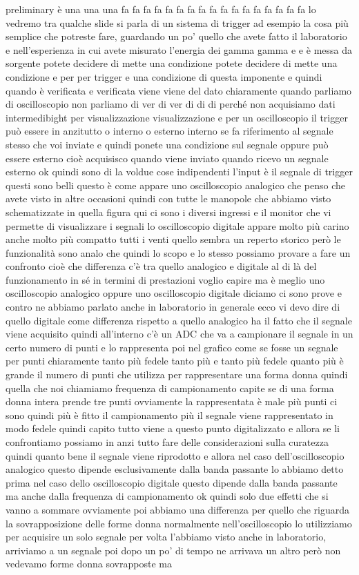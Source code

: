 preliminary è una una una fa fa fa fa fa fa fa fa fa fa fa fa fa fa fa fa fa lo vedremo tra qualche slide si parla di un sistema di trigger ad esempio la cosa più semplice che potreste fare, guardando un po' quello che avete fatto il laboratorio e nell'esperienza in cui avete misurato l'energia dei gamma gamma e e è messa da sorgente potete decidere di mette una condizione potete decidere di mette una condizione e per per trigger e una condizione di questa imponente e quindi quando è verificata e verificata viene viene del dato chiaramente quando parliamo di oscilloscopio non parliamo di ver di ver di di di perché non acquisiamo dati intermedibight per visualizzazione visualizzazione e per un oscilloscopio il trigger può essere in anzitutto o interno o esterno interno se fa riferimento al segnale stesso che voi inviate e quindi ponete una condizione sul segnale oppure può essere esterno cioè acquisisco quando viene inviato quando ricevo un segnale esterno ok quindi sono di la voldue cose indipendenti l'input è il segnale di trigger questi sono belli questo è come appare uno oscilloscopio analogico che penso che avete visto in altre occasioni quindi con tutte le manopole che abbiamo visto schematizzate in quella figura qui ci sono i diversi ingressi e il monitor che vi permette di visualizzare i segnali lo oscilloscopio digitale appare molto più carino anche molto più compatto tutti i venti quello sembra un reperto storico però le funzionalità sono analo che quindi lo scopo e lo stesso possiamo provare a fare un confronto cioè che differenza c'è tra quello analogico e digitale al di là del funzionamento in sé in termini di prestazioni voglio capire ma è meglio uno oscilloscopio analogico oppure uno oscilloscopio digitale diciamo ci sono prove e contro ne abbiamo parlato anche in laboratorio in generale ecco vi devo dire di quello digitale come differenza rispetto a quello analogico ha il fatto che il segnale viene acquisito quindi all'interno c'è un ADC che va a campionare il segnale in un certo numero di punti e lo rappresenta poi nel grafico come se fosse un segnale per punti chiaramente tanto più fedele tanto più e tanto più fedele quanto più è grande il numero di punti che utilizza per rappresentare una forma donna quindi quella che noi chiamiamo frequenza di campionamento capite se di una forma donna intera prende tre punti ovviamente la rappresentata è male più punti ci sono quindi più è fitto il campionamento più il segnale viene rappresentato in modo fedele quindi capito tutto viene a questo punto digitalizzato e allora se li confrontiamo possiamo in anzi tutto fare delle considerazioni sulla curatezza quindi quanto bene il segnale viene riprodotto e allora nel caso dell'oscilloscopio analogico questo dipende esclusivamente dalla banda passante lo abbiamo detto prima nel caso dello oscilloscopio digitale questo dipende dalla banda passante ma anche dalla frequenza di campionamento ok quindi solo due effetti che si vanno a sommare ovviamente poi abbiamo una differenza per quello che riguarda la sovrapposizione delle forme donna normalmente nell'oscilloscopio lo utilizziamo per acquisire un solo segnale per volta l'abbiamo visto anche in laboratorio, arriviamo a un segnale poi dopo un po' di tempo ne arrivava un altro però non vedevamo forme donna sovrapposte ma 